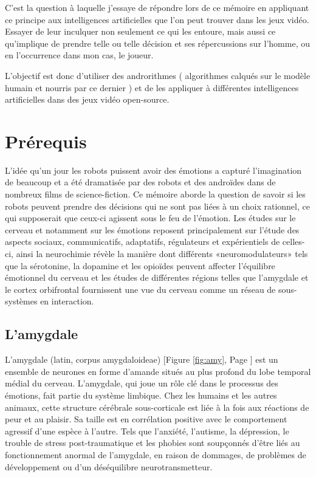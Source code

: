 C'est la question à laquelle j'essaye de répondre lors de ce mémoire en appliquant ce principe aux intelligences artificielles que l'on peut trouver dans les jeux vidéo. Essayer de leur inculquer non seulement ce qui les entoure, mais aussi ce qu'implique de prendre telle ou telle décision et ses répercussions sur l'homme, ou en l'occurrence dans mon cas, le joueur.

L'objectif est donc d'utiliser des androrithmes \parencite{humanityvstechnology} ( algorithmes calqués sur le modèle humain et nourris par ce dernier ) et de les appliquer à différentes intelligences artificielles dans des jeux vidéo open-source. 



\section{Prérequis}

L'idée qu'un jour les robots puissent avoir des émotions a capturé l'imagination de beaucoup et a été dramatisée par des robots et des androïdes dans de nombreux films de science-fiction. Ce mémoire aborde la question de savoir si les robots peuvent prendre des décisions qui ne sont pas liées à un choix rationnel, ce qui supposerait que ceux-ci agissent sous le feu de l’émotion. Les études sur le cerveau et notamment sur  les émotions reposent principalement sur l’étude des aspects sociaux, communicatifs, adaptatifs, régulateurs et expérientiels de celles-ci, ainsi la neurochimie révèle la manière dont différents «neuromodulateurs» tels que la sérotonine, la dopamine et les opioïdes peuvent affecter l’équilibre émotionnel du cerveau et les études de différentes régions telles que l'amygdale et le cortex orbifrontal fournissent une vue du cerveau comme un réseau de sous-systèmes en interaction. \parencite{whoneedsemotions}



\subsection{ L'amygdale}

L'amygdale (latin, corpus amygdaloideae) [Figure \ref{fig:amy}, Page \pageref{fig:amy}]
est un ensemble de neurones en forme d'amande situés au plus profond du lobe temporal médial du cerveau.
L'amygdale, qui joue un rôle clé dans le processus des émotions, fait partie du système limbique.
Chez les humains et les autres animaux, cette structure cérébrale sous-corticale est liée à la fois aux réactions de peur et au plaisir.
Sa taille est en corrélation positive avec le comportement agressif d'une espèce à l'autre.
Tels que l'anxiété, l'autisme, la dépression, le trouble de stress post-traumatique et les phobies sont soupçonnés d'être liés au fonctionnement anormal de l'amygdale, en raison de dommages, de problèmes de développement ou d'un déséquilibre neurotransmetteur.

